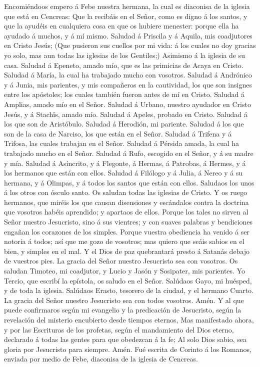  Encomiéndoos empero á Febe nuestra hermana, la cual es
diaconisa de la iglesia que está en Cencreas:  Que la
recibáis en el Señor, como es digno á los santos, y que la ayudéis en
cualquiera cosa en que os hubiere menester: porque ella ha ayudado á
muchos, y á mí mismo.  Saludad á Priscila y á Aquila, mis
coadjutores en Cristo Jesús;  (Que pusieron sus cuellos por
mi vida: á los cuales no doy gracias yo solo, mas aun todas las iglesias
de los Gentiles;)  Asimismo á la iglesia de su casa. Saludad
á Epeneto, amado mío, que es las primicias de Acaya en Cristo.
 Saludad á María, la cual ha trabajado mucho con vosotros.
 Saludad á Andrónico y á Junia, mis parientes, y mis
compañeros en la cautividad, los que son insignes entre los apóstoles;
los cuales también fueron antes de mí en Cristo.  Saludad á
Amplias, amado mío en el Señor.  Saludad á Urbano, nuestro
ayudador en Cristo Jesús, y á Stachîs, amado mío.  Saludad
á Apeles, probado en Cristo. Saludad á los que son de Aristóbulo.
 Saludad á Herodión, mi pariente. Saludad á los que son de
la casa de Narciso, los que están en el Señor.  Saludad á
Trifena y á Trifosa, las cuales trabajan en el Señor. Saludad á Pérsida
amada, la cual ha trabajado mucho en el Señor.  Saludad á
Rufo, escogido en el Señor, y á su madre y mía.  Saludad á
Asíncrito, y á Flegonte, á Hermas, á Patrobas, á Hermes, y á los
hermanos que están con ellos.  Saludad á Filólogo y á
Julia, á Nereo y á su hermana, y á Olimpas, y á todos los santos que
están con ellos.  Saludaos los unos á los otros con ósculo
santo. Os saludan todas las iglesias de Cristo.  Y os ruego
hermanos, que miréis los que causan disensiones y escándalos contra la
doctrina que vosotros habéis aprendido; y apartaos de ellos.
 Porque los tales no sirven al Señor nuestro Jesucristo,
sino á sus vientres; y con suaves palabras y bendiciones engañan los
corazones de los simples.  Porque vuestra obediencia ha
venido á ser notoria á todos; así que me gozo de vosotros; mas quiero
que seáis sabios en el bien, y simples en el mal.  Y el
Dios de paz quebrantará presto á Satanás debajo de vuestros pies. La
gracia del Señor nuestro Jesucristo sea con vosotros.  Os
saludan Timoteo, mi coadjutor, y Lucio y Jasón y Sosipater, mis
parientes.  Yo Tercio, que escribí la epístola, os saludo
en el Señor.  Salúdaos Gayo, mi huésped, y de toda la
iglesia. Salúdaos Erasto, tesorero de la ciudad, y el hermano Cuarto.
 La gracia del Señor nuestro Jesucristo sea con todos
vosotros. Amén.  Y al que puede confirmaros según mi
evangelio y la predicación de Jesucristo, según la revelación del
misterio encubierto desde tiempos eternos,  Mas manifestado
ahora, y por las Escrituras de los profetas, según el mandamiento del
Dios eterno, declarado á todas las gentes para que obedezcan á la fe;
 Al solo Dios sabio, sea gloria por Jesucristo para
siempre. Amén. Fué escrita de Corinto á los Romanos, enviada por medio
de Febe, diaconisa de la iglesia de Cencreas.
